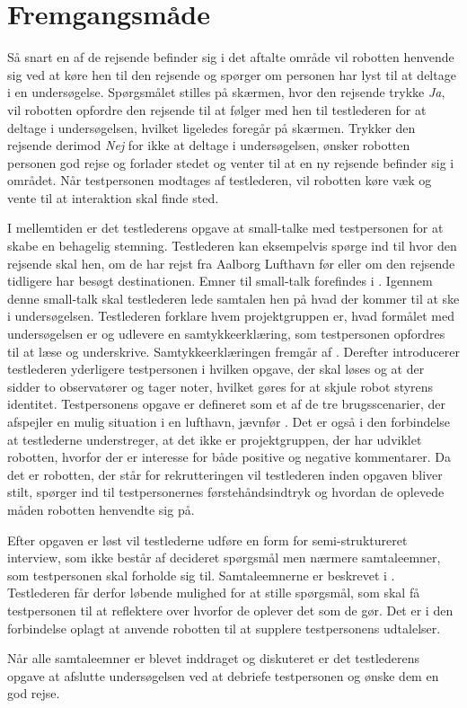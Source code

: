\section{Fremgangsmåde}
\label{ParametreFremgangsmaade}
%
Så snart en af de rejsende befinder sig i det aftalte område vil robotten henvende sig ved at køre hen til den rejsende og spørger om personen har lyst til at deltage i en undersøgelse. Spørgsmålet stilles på skærmen, hvor den rejsende trykke \textit{Ja}, vil robotten opfordre den rejsende til at følger med hen til testlederen for at deltage i undersøgelsen, hvilket ligeledes foregår på skærmen. Trykker den rejsende derimod \textit{Nej} for ikke at deltage i undersøgelsen, ønsker robotten personen god rejse og forlader stedet og venter til at en ny rejsende befinder sig i området. Når testpersonen modtages af testlederen, vil robotten køre væk og vente til at interaktion skal finde sted. 

I mellemtiden er det testlederens opgave at small-talke med testpersonen for at skabe en behagelig stemning. Testlederen kan eksempelvis spørge ind til hvor den rejsende skal hen, om de har rejst fra Aalborg Lufthavn før eller om den rejsende tidligere har besøgt destinationen. Emner til small-talk forefindes i . Igennem denne small-talk skal testlederen lede samtalen hen på hvad der kommer til at ske i undersøgelsen. Testlederen forklare hvem projektgruppen er, hvad formålet med undersøgelsen er og udlevere en samtykkeerklæring, som testpersonen opfordres til at læse og underskrive. Samtykkeerklæringen fremgår af . Derefter introducerer testlederen yderligere testpersonen i hvilken opgave, der skal løses og at der sidder to observatører og tager noter, hvilket gøres for at skjule robot styrens identitet. Testpersonens opgave er defineret som et af de tre brugsscenarier, der afspejler en mulig situation i en lufthavn, jævnfør . Det er også i den forbindelse at testlederne understreger, at det ikke er projektgruppen, der har udviklet robotten, hvorfor der er interesse for både positive og negative kommentarer. Da det er robotten, der står for rekrutteringen vil testlederen inden opgaven bliver stilt, spørger ind til testpersonernes førstehåndsindtryk og hvordan de oplevede måden robotten henvendte sig på. 

Efter opgaven er løst vil testlederne udføre en form for semi-struktureret interview, som ikke består af decideret spørgsmål men nærmere samtaleemner, som testpersonen skal forholde sig til. Samtaleemnerne er beskrevet i . Testlederen får derfor løbende mulighed for at stille spørgsmål, som skal få testpersonen til at reflektere over hvorfor de oplever det som de gør. Det er i den forbindelse oplagt at anvende robotten til at supplere testpersonens udtalelser. 

Når alle samtaleemner er blevet inddraget og diskuteret er det testlederens opgave at afslutte undersøgelsen ved at debriefe testpersonen og ønske dem en god rejse.       



